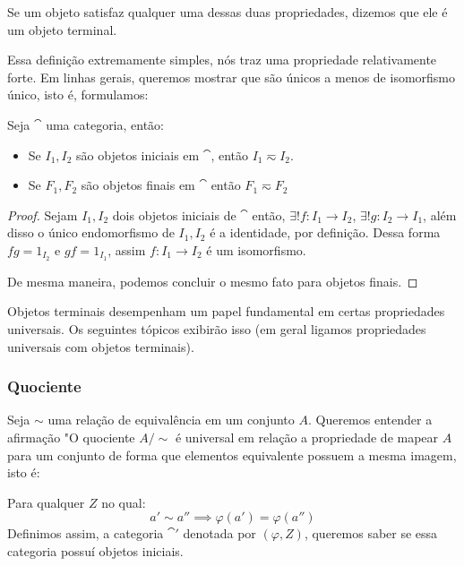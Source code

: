 \documentclass[../main]{subfiles}
\begin{document}
Se um objeto satisfaz qualquer uma dessas duas propriedades, dizemos que ele é
um objeto terminal. 

Essa definição extremamente simples, nós traz uma propriedade relativamente
forte. Em linhas gerais, queremos mostrar que são únicos a menos de isomorfismo
único, isto é, formulamos:
\begin{prop}
    Seja \(\cat\) uma categoria, então:
    \begin{itemize}
        \item Se \(I_1, I_2\) são objetos iniciais em \(\cat\), então \(I_1
        \eqsim I_2\).
        \item Se \(F_1, F_2\) são objetos finais em \(\cat\) então \(F_1 \eqsim
        F_2\)
    \end{itemize}
\end{prop}
\begin{proof}
    Sejam \(I_1, I_2\) dois objetos iniciais de \(\cat\) então, \(\exists! f:
    I_1 \to I_2\), \(\exists! g: I_2 \to I_1\), além disso o único endomorfismo
    de \(I_1, I_2\) é a identidade, por definição. Dessa forma \(fg = 1_{I_2}\)
    e \(gf = 1_{I_1}\), assim \(f: I_1 \to I_2\) é um isomorfismo.

    De mesma maneira, podemos concluir o mesmo fato para objetos finais.
\end{proof}
Objetos terminais desempenham um papel fundamental em certas propriedades
universais. Os seguintes tópicos exibirão isso (em geral ligamos propriedades
universais com objetos terminais).
\subsubsection*{Quociente}
    Seja \(\sim\) uma relação de equivalência em um conjunto \(A\). Queremos
    entender a afirmação "O quociente \(A/\sim\) é universal em relação a
    propriedade de mapear \(A\) para um conjunto de forma que elementos
    equivalente possuem a mesma imagem, isto é:
    \begin{center}
    \end{center}
    
    Para qualquer \(Z\) no qual:
    \[a' \sim a'' \implies \varphi(a') = \varphi(a'')\] Definimos assim, a
    categoria \(\cat'\) denotada por \((\varphi, Z)\), queremos saber se essa
    categoria possuí objetos iniciais.
\end{document}
